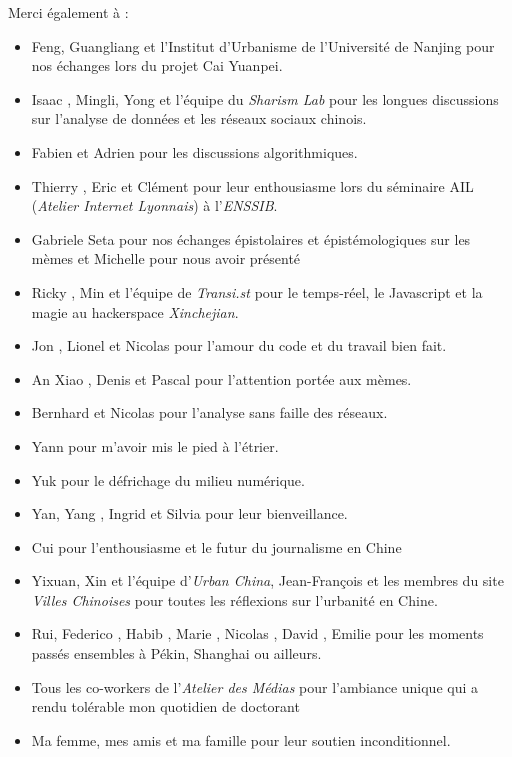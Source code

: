 Merci également à : 
\begin{itemize}
    \item {} Feng, {} Guangliang et l'Institut d'Urbanisme de l'Université de Nanjing pour  nos échanges lors du projet Cai Yuanpei.
    \item Isaac {}, {} Mingli, {} Yong et l'équipe du \textit{Sharism Lab} pour les longues discussions sur l'analyse de données et les réseaux sociaux chinois.
    \item Fabien {} et Adrien {} pour les discussions algorithmiques.
    \item Thierry {}, Eric {} et Clément {} pour leur enthousiasme lors du séminaire AIL (\textit{Atelier Internet Lyonnais}) à l'\textit{ENSSIB}.
    \item Gabriele {} Seta pour nos échanges épistolaires et épistémologiques sur les mèmes et Michelle {} pour nous avoir présenté
    \item Ricky {}, Min {} et l'équipe de \textit{Transi.st} pour le temps-réel, le Javascript et la magie au hackerspace \textit{Xinchejian}.
    \item Jon {}, Lionel {} et Nicolas {} pour l'amour du code et du travail bien fait.
    \item An Xiao {}, Denis {} et Pascal {} pour l'attention portée aux mèmes.
    \item Bernhard {} et Nicolas {} pour l'analyse sans faille des réseaux.
    \item Yann {} pour m'avoir mis le pied à l'étrier.
    \item Yuk {} pour le défrichage du milieu numérique.
    \item {} Yan, Yang {}, Ingrid {} et Silvia {} pour leur bienveillance.
    \item Cui {} pour l'enthousiasme et le futur du journalisme en Chine
    \item {} Yixuan, {} Xin et l'équipe d'\textit{Urban China}, Jean-François {} et les membres du site \textit{Villes Chinoises} pour toutes les réflexions sur l'urbanité en Chine.
    \item {} Rui, Federico {}, Habib {}, Marie {}, Nicolas {}, David {}, Emilie {} pour les moments passés ensembles à Pékin, Shanghai ou ailleurs.
    \item Tous les co-workers de l'\textit{Atelier des Médias} pour l'ambiance unique qui a rendu tolérable mon quotidien de doctorant
    \item Ma femme, mes amis et ma famille pour leur soutien inconditionnel.
\end{itemize}

